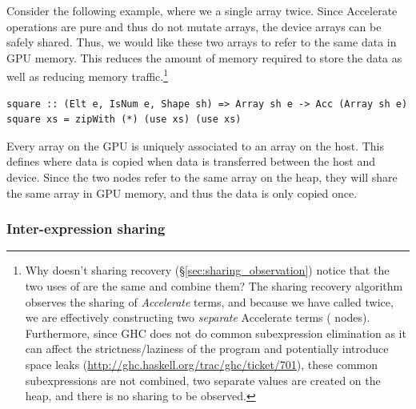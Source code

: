 Consider the following example, where we  a single array twice. Since
Accelerate operations are pure and thus do not mutate arrays, the device arrays
can be safely shared. Thus, we would like these two arrays to refer to the same
data in GPU memory. This reduces the amount of memory required to store the data
as well as reducing memory traffic.\footnote{Why doesn't sharing recovery
(\S\ref{sec:sharing_observation}) notice that the two uses of  are
the same and combine them? The sharing recovery algorithm observes the sharing
of \emph{Accelerate} terms, and because we have called  twice, we
are effectively constructing two \emph{separate} Accelerate terms
( nodes). Furthermore, since GHC does not do common subexpression
elimination as it can affect the strictness/laziness of the program and
potentially introduce space leaks
(\url{http://ghc.haskell.org/trac/ghc/ticket/701}), these common subexpressions
are not combined, two separate values are created on the heap, and there is no
sharing to be observed.}
%
\begin{lstlisting}[style=haskell]
square :: (Elt e, IsNum e, Shape sh) => Array sh e -> Acc (Array sh e)
square xs = zipWith (*) (use xs) (use xs)
\end{lstlisting}

Every array on the GPU is uniquely associated to an array on the host. This
defines where data is copied when data is transferred between the host and
device. Since the two  nodes refer to the same array on the heap, they
will share the same array in GPU memory, and thus the data is only copied once.

\subsubsection{Inter-expression sharing}

